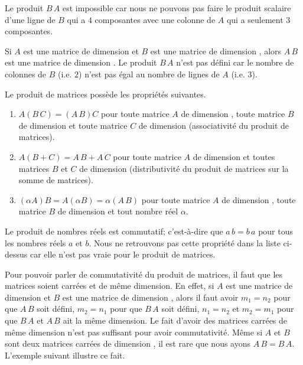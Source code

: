 {\begin{egg}
Le produit $B\,A$ est impossible car nous ne pouvons pas faire le produit
scalaire d'une ligne de $B$ qui a $4$ composantes avec une colonne de
$A$ qui a seulement $3$ composantes.
\end{egg}

\begin{egg}
Si $A$ est une matrice de dimension  et $B$ est une matrice
de dimension , alors $A\,B$ est une matrice de dimension
.  Le produit $B\,A$ n'est pas défini car le nombre de
colonnes de $B$ (i.e. $2$) n'est pas égal au nombre de lignes de $A$
(i.e. $3$).
\end{egg}

Le produit de matrices possède les propriétés suivantes.

\begin{prop}
\begin{enumerate}
\item $A(B\,C)= (A\,B)C$ pour toute matrice $A$ de dimension
, toute matrice $B$ de dimension  et toute matrice
$C$ de dimension  (associativité du produit de matrices).
\item $A(B+C) = A\,B + A\,C$ pour toute matrice $A$ de dimension
 et toutes matrices $B$ et $C$ de dimension 
(distributivité du produit de matrices sur la somme de matrices).
\item $(\alpha A)B = A(\alpha B) = \alpha (A\,B)$ pour toute matrice
$A$ de dimension , toute matrice $B$ de dimension 
et tout nombre réel $\alpha$.
\end{enumerate}
\end{prop}

Le produit de nombres réels est commutatif; c'est-à-dire que
$a\,b=b\,a$ pour tous les nombres réels $a$ et $b$.  Nous ne retrouvons
pas cette propriété dans la liste ci-dessus car elle n'est pas vraie
pour le produit de matrices.

Pour pouvoir parler de commutativité du produit de matrices, il faut
que les matrices soient carrées et de même dimension.  En effet, si
$A$ est une matrice de dimension  et $B$ est une matrice
de dimension , alors il faut avoir $m_1 = n_2$ pour que
$A\,B$ soit défini, $m_2 = n_1$ pour que $B\,A$ soit défini, $n_1=n_2$
et $m_2 = m_1$ pour que $B\,A$ et $A\,B$ ait la même dimension.  Le
fait d'avoir des matrices carrées de même dimension n'est pas
suffisant pour avoir commutativité.  Même si $A$ et $B$ sont deux
matrices carrées de dimension \nn, il est rare que nous ayons
$A\,B = B\,A$.  L'exemple suivant illustre ce fait.

}
